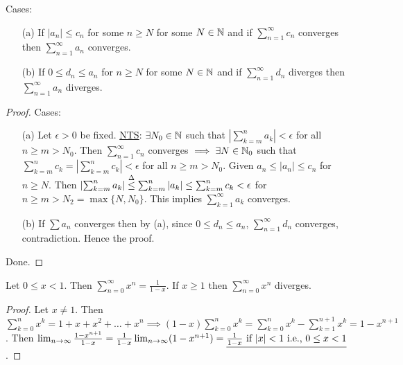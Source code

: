 \documentclass[]{article}
\begin{document}
\begin{theorem}
	 Cases:
	\begin{enumerate}
		\item[(a)] If $|a_n|\leq c_n$ for some $n\geq N$ for some $N\in\mathbb{N}$ and if $\sum_{n=1}^\infty c_n$ converges then $\sum_{n=1}^\infty a_n$ converges.
		\item[(b)] If $0\leq d_n\leq a_n$ for $n\geq N$ for some $N\in\mathbb{N}$ and if $\sum_{n=1}^\infty d_n$ diverges then $\sum_{n=1}^\infty a_n$ diverges.
	\end{enumerate}
\end{theorem}
\begin{proof}
	Cases:
	\begin{enumerate}
		\item[(a)] Let $\epsilon>0$ be fixed.
			\ul{NTS}: $\exists N_0\in\mathbb{N}$ such that $\left|\sum_{k=m}^n a_k\right|<\epsilon$ for all $n\geq m>N_0$.
			Then $\sum_{n=1}^\infty c_n$ converges $\implies\exists N\in\mathbb{N}_0$ such that $\sum_{k=m}^n c_k = \left|\sum_{k=m}^n c_k\right|<\epsilon$ for all $n\geq m>N_0$.
			Given $a_n\leq|a_n|\leq c_n$ for $n\geq N$.
			Then $\left|\sum_{k=m}^n a_k\right|\overset{\Delta}{\leq} \sum_{k=m}^n|a_k| \leq \sum_{k=m}^n c_k < \epsilon$ for $n\geq m>N_2 = \max\{N,N_0\}$.
			This implies $\sum_{k=1}^\infty a_k$ converges.
		\item[(b)] If $\sum a_n$ converges then by (a), since $0\leq d_n\leq a_n$, $\sum_{n=1}^\infty d_n$ converges, contradiction. Hence the proof.
	\end{enumerate}
	Done.
\end{proof}

\begin{theorem}
	Let $0\leq x<1$. Then $\sum_{n=0}^\infty x^n = \frac{1}{1-x}$. If $x\geq 1$ then $\sum_{n=0}^\infty x^n$ diverges.
\end{theorem}
\begin{proof}
	Let $x\neq 1$. Then $\sum_{k=0}^n x^k = 1+x+x^2+\dots+x^n \implies (1-x)\sum_{k=0}^n x^k = \sum_{k=0}^n x^k -\sum_{k=1}^{n+1}x^k = 1-x^{n+1}$.
	Then $\lim_{n\rightarrow\infty} \frac{1-x^{n+1}}{1-x} = \frac{1}{1-x}\lim_{n\rightarrow\infty}(1-x^{n+1}) = \underline{\frac{1}{1-x} \text{ if } |x|<1 \text{ i.e., }0\leq x<1}$.
\end{proof}
\end{document}
